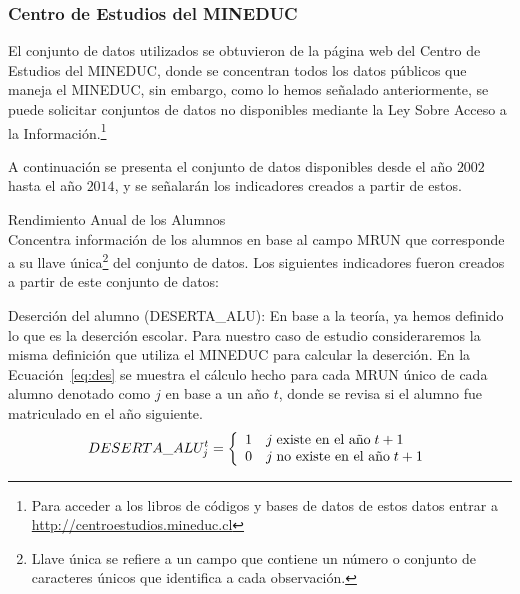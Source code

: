 \subsubsection{Centro de Estudios del MINEDUC}
    El conjunto de datos utilizados se obtuvieron de la página web del Centro de Estudios del MINEDUC, donde se concentran todos los datos públicos que maneja el MINEDUC, sin embargo, como lo hemos señalado anteriormente, se puede solicitar conjuntos de datos no disponibles mediante la Ley Sobre Acceso a la Información.\footnote{Para acceder a los libros de códigos y bases de datos de estos datos entrar a \url{http://centroestudios.mineduc.cl}}
    
    A continuación se presenta el conjunto de datos disponibles desde el año $2002$ hasta el año $2014$, y se señalarán los indicadores creados a partir de estos.
    \begin{longdescription}
        \item[Rendimiento Anual de los Alumnos] \hfill \\
        Concentra información de los alumnos en base al campo MRUN que corresponde a su llave única\footnote{Llave única se refiere a un campo que contiene un número o conjunto de caracteres únicos que identifica a cada observación.} del conjunto de datos.
        Los siguientes indicadores fueron creados a partir de este conjunto de datos:
            \begin{longdescription}
              \item[Deserción del alumno] (DESERTA\_ALU): En base a la teoría, ya hemos definido lo que es la deserción escolar. Para nuestro caso de estudio consideraremos la misma definición que utiliza el MINEDUC para calcular la deserción.
              En la Ecuación~\ref{eq:des} se muestra el cálculo hecho para cada MRUN único de cada alumno denotado como $j$ en base a un año $t$, donde se revisa si el alumno fue matriculado en el año siguiente.
              \begin{equation}
              \centering
              DESERTA\_ALU_{j}^{t} = \left\{
                \begin{array}{c l}
                 1 & j \; \mbox{existe en el año} \; t + 1\\
                 0 & j \; \mbox{no existe en el año} \; t + 1
                \end{array}
                \right.
                \label{eq:des}
              \end{equation}
                

\end{longdescription}
\end{longdescription}
